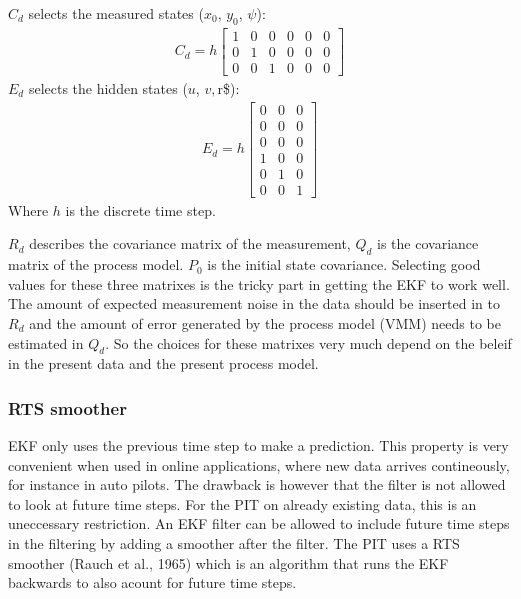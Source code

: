 \documentclass[review]{elsarticle}
\begin{document}
\sphinxAtStartPar
\(C_d\) selects the measured states (\(x_0\), \(y_0\), \(\psi\)):
\begin{equation}\label{equation:04.01_EK:eqcd}
\begin{split}\displaystyle C_{d} = h \left[\begin{matrix}1 & 0 & 0 & 0 & 0 & 0\\0 & 1 & 0 & 0 & 0 & 0\\0 & 0 & 1 & 0 & 0 & 0\end{matrix}\right]\end{split}
\end{equation}
\sphinxAtStartPar
\(E_d\) selects the hidden states (\(u\), \(v, \)r\$):
\begin{equation}\label{equation:04.01_EK:eqed}
\begin{split}\displaystyle E_{d} = h \left[\begin{matrix}0 & 0 & 0\\0 & 0 & 0\\0 & 0 & 0\\1 & 0 & 0\\0 & 1 & 0\\0 & 0 & 1\end{matrix}\right]\end{split}
\end{equation}
\sphinxAtStartPar
Where \(h\) is the discrete time step.

\sphinxAtStartPar
\(R_d\) describes the covariance matrix of the measurement, \(Q_d\) is the covariance matrix of the process model. \(P_0\) is the initial state covariance.
Selecting good values for these three matrixes is the tricky part in getting the EKF to work well. The amount of expected measurement noise in the data should be inserted in to \(R_d\) and the amount of error generated by the process model (VMM) needs to be estimated in \(Q_d\). So the choices for these matrixes very much depend on the beleif in the present data and the present process model.


\subsubsection{RTS smoother}
\label{\detokenize{04.01_EK:rts-smoother}}\label{\detokenize{04.01_EK:rts}}
\sphinxAtStartPar
EKF only uses the previous time step to make a prediction. This property is very convenient when used in online applications, where new data arrives contineously, for instance in auto pilots. The drawback is however that the filter is not allowed to look at future time steps. For the PIT on already existing data, this is an uneccessary restriction. An EKF filter can be allowed to include future time steps in the filtering by adding a smoother after the filter. The PIT uses a RTS smoother (Rauch et al., 1965) which is an algorithm that runs the EKF backwards to also acount for future time steps.
\end{document}
